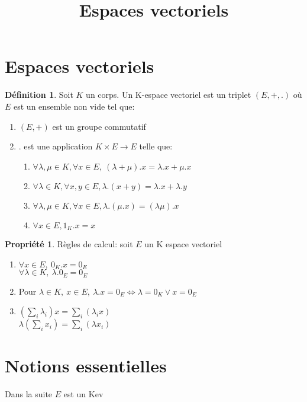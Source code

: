\documentclass[fleqn]{article}
\title{Espaces vectoriels}
\date{}
\theoremstyle{definition} \newtheorem*{defi}{D\'efinition}
\theoremstyle{definition} \newtheorem*{theo}{Th\'eor\`eme}
\theoremstyle{definition} \newtheorem*{coro}{Corollaire}
\theoremstyle{definition} \newtheorem*{nota}{Notation}
\theoremstyle{remark} \newtheorem*{rqs}{Remarques}
\theoremstyle{definition} \newtheorem*{prop}{Propri\'et\'e}
\begin{document}
\maketitle

\section{Espaces vectoriels}
\begin{defi}
	Soit $K$ un corps. Un K-espace vectoriel est un triplet $(E, + ,.)$ o\`u $E$ est un ensemble non vide tel que:
	\begin{enumerate}
		\item $(E,+)$ est un groupe commutatif
		\item $.$ est une application $K \times E \rightarrow E$ telle que:
		\begin{enumerate}
			\item $\forall \lambda, \mu \in K, \forall x \in E,\ (\lambda + \mu).x = \lambda . x + \mu . x$
			\item $\forall \lambda \in K, \forall x,y \in E, \lambda . (x+y) = \lambda . x + \lambda . y$
			\item $\forall \lambda, \mu \in K, \forall x \in E, \lambda . (\mu . x) = (\lambda \mu). x$
			\item $\forall x \in E, 1_K . x = x$
		\end{enumerate}
	\end{enumerate}
\end{defi}

\begin{prop} R\`egles de calcul: soit $E$ un K espace vectoriel
	\begin{enumerate}
		\item $\forall x \in E,\ 0_K . x = 0_E$\\
			$\forall \lambda \in K,\ \lambda . 0_E = 0_E$
		\item Pour $\lambda \in K,\ x \in E,\ \lambda . x = 0_E \Leftrightarrow \lambda = 0_K \lor x = 0_E$
		\item $\left( \sum_i \lambda_i \right) x = \sum_i \left(\lambda_i x \right)$\\
			$\lambda \left( \sum_i x_i \right) = \sum_i \left(\lambda x_i \right)$
	\end{enumerate}
\end{prop}

\section{Notions essentielles}
Dans la suite $E$ est un Kev
\end{document}
